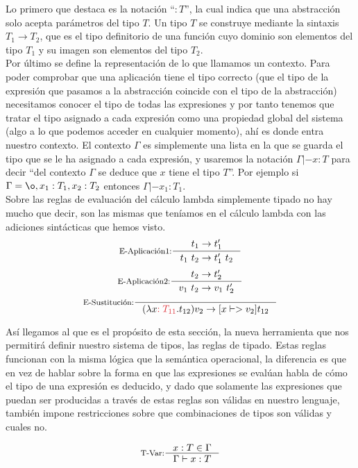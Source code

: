 \bigskip

Lo primero que destaca es la notación ``$:T$'', la cual indica que una abstracción solo acepta parámetros del tipo $T$. Un tipo $T$ se construye mediante la sintaxis $T_1 \to T_2$, que es el tipo definitorio de una
función cuyo dominio son elementos del tipo $T_1$ y su imagen son elementos del tipo $T_2$.\\

Por último se define la representación de lo que llamamos un contexto. Para poder comprobar que una aplicación
tiene el tipo correcto (que el tipo de la expresión que pasamos a la abstracción coincide con el tipo de la abstracción) necesitamos conocer el tipo de todas las expresiones y por tanto tenemos que tratar el tipo asignado a cada expresión como una propiedad global del sistema (algo a lo que podemos acceder en cualquier momento), ahí es donde entra nuestro contexto. El contexto $\Gamma$ es simplemente una lista en la que se guarda el tipo que se le ha asignado a cada expresión, y usaremos la notación $\Gamma |- x:T$ para decir ``del contexto $\Gamma$ se deduce que $x$ tiene el tipo $T$''. Por ejemplo si $\Gamma = \o, x_1:T_1, x_2:T_2$ entonces $\Gamma |- x_1:T_1$.\\

Sobre las reglas de evaluación del cálculo lambda simplemente tipado no hay mucho que decir, son las mismas que
teníamos en el cálculo lambda con las adiciones sintácticas que hemos visto.\\

\[
\inference[E-Aplicación1:]{t_1 -> t_1'}{t_1\ t_2 -> t_1'\ t_2}\\
\]
\[
\inference[E-Aplicación2:]{t_2 -> t_2'}{v_1\ t_2 -> v_1\ t_2'}\\
\]
\[
\inference[E-Sustitución:]{}{(\lambda x\textcolor{myred}{:T_{11}}.t_{12})v_2 -> [x |-> v_2]t_{12}}
\]
\bigskip

Así llegamos al que es el propósito de esta sección, la nueva herramienta que nos permitirá definir nuestro sistema de tipos, las reglas de tipado. Estas reglas funcionan con la misma lógica que la semántica operacional, la diferencia es que en vez de hablar sobre la forma en que las expresiones se evalúan habla de cómo el tipo de una
expresión es deducido, y dado que solamente las expresiones que puedan ser producidas a través de estas reglas
son válidas en nuestro lenguaje, también impone restricciones sobre que combinaciones de tipos son válidas y cuales no.

\[\inference[T-Var:]{x:T \in \Gamma}{\Gamma |- x:T}\]


